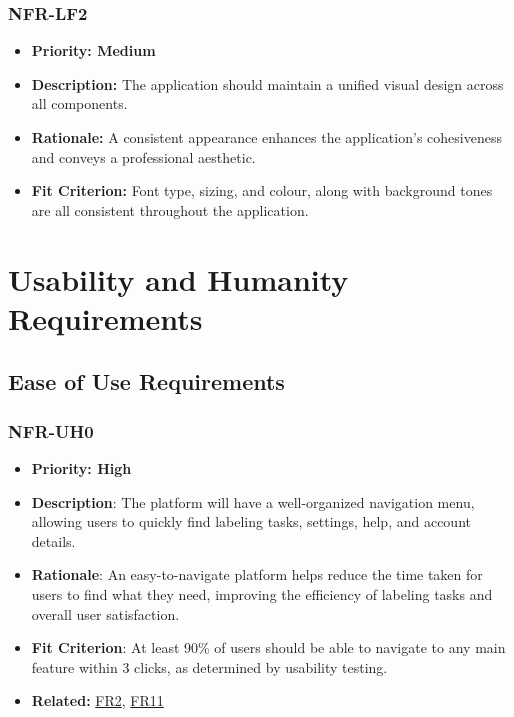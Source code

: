 \documentclass[12pt]{article}
\begin{document}
\subsubsection*{NFR-LF2}
\label{sec:LF2}
\begin{itemize}
  \item \textbf{Priority: Medium}
  \item \textbf{Description:} The application should maintain a unified visual design across all components.
  \item \textbf{Rationale:} A consistent appearance enhances the application's cohesiveness and conveys a professional aesthetic.
  \item \textbf{Fit Criterion:} Font type, sizing, and colour, along with background tones are all consistent throughout the application.
\end{itemize}

\section{Usability and Humanity Requirements}

\subsection{Ease of Use Requirements}



\subsubsection*{NFR-UH0}
\label{sec:UH0}
      \begin{itemize}
        \item \textbf{Priority: High}
          \item \textbf{Description}: The platform will have a well-organized navigation menu, allowing users to quickly find labeling tasks, settings, help, and account details.  
          \item \textbf{Rationale}: An easy-to-navigate platform helps reduce the time taken for users to find what they need, improving the efficiency of labeling tasks and overall user satisfaction.  
          \item \textbf{Fit Criterion}: At least 90\% of users should be able to navigate to any main feature within 3 clicks, as determined by usability testing.
          \item \textbf{Related:} \hyperref[sec:FR2]{FR2}, \hyperref[sec:FR11]{FR11}
      \end{itemize}
\end{document}
